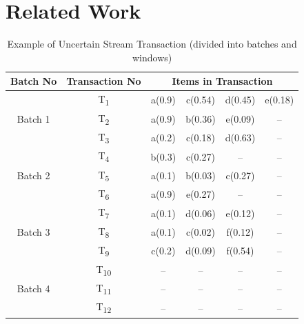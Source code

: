 \documentclass[conference]{IEEEtran}
\begin{document}
\section{Related Work}\label{Related_work}
\begin{table}
\centering

\begin{tabular}{|c|c|c|c|c|c|}
\hline
	Batch No& Transaction No & \multicolumn{4}{c|}{Items in Transaction} \\ \hline \hline
	\multirow{3}{*}{Batch 1}	&	T\textsubscript{1} & a(0.9) & c(0.54) & d(0.45) & e(0.18)		\\
								&	T\textsubscript{2} & a(0.9) & b(0.36) & e(0.09) & --			\\
								&	T\textsubscript{3} & a(0.2) & c(0.18) & d(0.63) & --			\\\hline
	\multirow{3}{*}{Batch 2}	&	T\textsubscript{4} & b(0.3) & c(0.27) & --  	& --			\\
								&	T\textsubscript{5} & a(0.1) & b(0.03) & c(0.27) & --  			\\
								&	T\textsubscript{6} & a(0.9) & e(0.27) & --	    & --  			\\\hline
	\multirow{3}{*}{Batch 3}	&	T\textsubscript{7} & a(0.1) & d(0.06) & e(0.12) & --			\\
								&	T\textsubscript{8} & a(0.1) & c(0.02) & f(0.12) & --   			\\
								&	T\textsubscript{9} & c(0.2) & d(0.09) & f(0.54) & --   			\\\hline
								
	\multirow{3}{*}{Batch 4}	&	T\textsubscript{10} &  --  &  --  &  --  & --    				\\
								&	T\textsubscript{11} &  --  &  --  &  --  & --    				\\
								&	T\textsubscript{12} &  --  &  --  &  --  & --    				\\\hline
	\end{tabular}
\caption{Example of Uncertain Stream Transaction (divided into batches and windows)}
\label{table:prefix_assigned}
\end{table}
\end{document}
